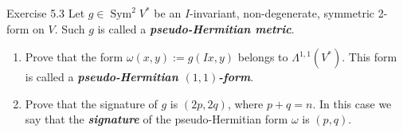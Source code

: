 \begin{thing9}{Exercise 5.3}\leavevmode
	Let $g\in\operatorname{Sym}^2V^*$ be an $I$-invariant, non-degenerate, symmetric 2-form on $V$. Such $g$ is called a \textit{\textbf{pseudo-Hermitian metric}}.
	\begin{enumerate}[label=\alph*.]
		\item Prove that the form $\omega(x,y):=g(Ix,y)$ belongs to $\Lambda^{1,1}(V^*)$. This form is called a \textit{\textbf{pseudo-Hermitian $(1,1)$-form}}.

		\item Prove that the signature of $g$ is $(2p,2q)$, where $p+q=n$. In this case we say that the \textit{\textbf{signature}} of the pseudo-Hermitian form $\omega$ is $(p,q)$.
	\end{enumerate}
\end{thing9}


